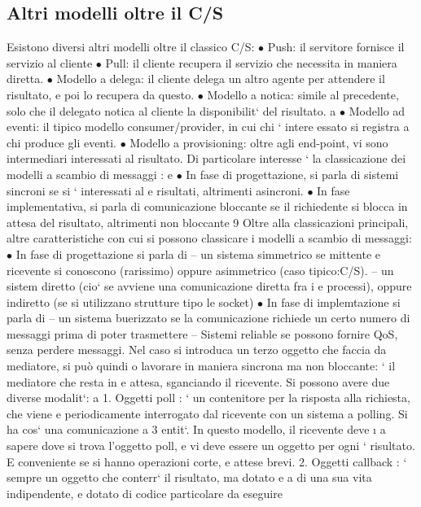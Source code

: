 \documentclass[a4paper,12pt]{article}
\begin{document}
\subsection{Altri modelli oltre il C/S}
Esistono diversi altri modelli oltre il classico C/S:
$\bullet$ Push: il servitore fornisce il servizio al cliente
$\bullet$ Pull: il cliente recupera il servizio che necessita in maniera diretta.
$\bullet$ Modello a delega: il cliente delega un altro agente per attendere il risultato,
e poi lo recupera da questo.
$\bullet$ Modello a notica: simile al precedente, solo che il delegato notica al
cliente la disponibilit` del risultato.
a
$\bullet$ Modello ad eventi: il tipico modello consumer/provider, in cui chi ` intere
essato si registra a chi produce gli eventi.
$\bullet$ Modello a provisioning: oltre agli end-point, vi sono intermediari interessati al risultato.
Di particolare interesse ` la classicazione dei modelli a scambio di messaggi :
e
$\bullet$ In fase di progettazione, si parla di sistemi sincroni se si ` interessati al
e
risultati, altrimenti asincroni.
$\bullet$ In fase implementativa, si parla di comunicazione bloccante se il richiedente
si blocca in attesa del risultato, altrimenti non bloccante
9
Oltre alla classicazioni principali, altre caratteristiche con cui si possono classicare i modelli a scambio di
messaggi:
$\bullet$ In fase di progettazione si parla di
-- un sistema simmetrico se mittente e ricevente si conoscono (rarissimo) oppure asimmetrico (caso tipico:C/S).
-- un sistem diretto (cio` se avviene una comunicazione diretta fra i
e
processi), oppure indiretto (se si utilizzano strutture tipo le socket)
$\bullet$ In fase di implemtazione si parla di
-- un sistema buerizzato se la comunicazione richiede un certo numero
di messaggi prima di poter trasmettere
-- Sistemi reliable se possono fornire QoS, senza perdere messaggi.
Nel caso si introduca un terzo oggetto che faccia da mediatore, si può quindi
o
lavorare in maniera sincrona ma non bloccante: ` il mediatore che resta in
e
attesa, sganciando il ricevente. Si possono avere due diverse modalit`:
a
1. Oggetti poll : ` un contenitore per la risposta alla richiesta, che viene
e
periodicamente interrogato dal ricevente con un sistema a polling. Si ha
cos` una comunicazione a 3 entit`. In questo modello, il ricevente deve
\i{}
a
sapere dove si trova l'oggetto poll, e vi deve essere un oggetto per ogni
`
risultato. E conveniente se si hanno operazioni corte, e attese brevi.
2. Oggetti callback : ` sempre un oggetto che conterr` il risultato, ma dotato
e
a
di una sua vita indipendente, e dotato di codice particolare da eseguire
\end{document}
